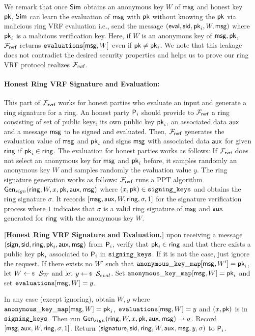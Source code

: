 We remark that once $ \mathsf{Sim} $ obtains an anonymous key $ W $ of  $ \mathsf{msg} $  and honest key $ \mathsf{pk} $,  $ \mathsf{Sim} $ can learn the  evaluation of  $ \mathsf{msg} $ with $ \mathsf{pk} $ without knowing the $ \mathsf{pk} $ via malicious ring VRF evaluation i.e., send the message $ (\mathsf{eval}, \textsf{sid}, \mathsf{pk}_i,W,\mathsf{msg}) $ where $ \mathsf{pk}_i $ is a malicious verification key. Here, if $ W $ is an anonymous key of $ \mathsf{msg}, \mathsf{pk}  $, $ \mathcal{F}_{\textsf{rvrf}} $ returns $ \texttt{evaluations}[\mathsf{msg}, W] $ even if $ \mathsf{pk} \neq \mathsf{pk}_i $. We note that this leakage does not contradict the desired security properties and helps us to prove our ring VRF protocol realizes $ \mathcal{F}_{\textsf{rvrf}} $.  


\paragraph{Honest Ring VRF Signature and Evaluation:} This part of $ \mathcal{F}_{\textsf{rvrf}} $ works for honest parties who evaluate an input and generate a ring signature for a ring. An honest party $ \mathsf{P}_i $ should provide to $ \mathcal{F}_{\textsf{rvrf}} $ a ring consisting of set of public keys, its own public key $ \mathsf{pk}_i $,  an associated data $ \mathsf{aux} $ and a message $ \mathsf{msg} $ to be signed and evaluated. Then, $ \mathcal{F}_{\textsf{rvrf}} $ generates the evaluation value of $ \mathsf{msg} $ and $ \mathsf{pk}_i $ and signs $ \mathsf{msg} $ with associated data $ \mathsf{aux} $ for given $ \mathsf{ring} $ if $ \mathsf{pk}_i \in \mathsf{ring} $. The evaluation for honest parties works as follows: If $ \mathcal{F}_{\textsf{rvrf}} $ does not select an anonymous key for $ \mathsf{msg} $ and $ \mathsf{pk}_i $ before, it samples randomly an anonymous key $ W $ and samples randomly the evaluation value $ y $. The ring signature generation works as follows:  $ \mathcal{F}_{\textsf{rvrf}} $ runs a PPT algorithm $ \mathsf{Gen}_{sign}(\mathsf{ring}, W, x,\mathsf{pk},\mathsf{aux},\mathsf{msg}) $ where $ (x,\mathsf{pk}) \in \texttt{signing\_keys} $ and obtains the ring signature $ \sigma $. It records $  [\mathsf{msg},\mathsf{aux}, W, \mathsf{ring},\sigma, 1]  $ for the signature verification process where $ 1 $ indicates that $ \sigma  $ is a valid ring signature of $ \mathsf{msg} $ and $ \mathsf{aux} $ generated for $ \mathsf{ring} $ with the anonymous key $ W $.

\begin{tcolorbox}[left=2pt,right=2pt]
	\eprint{}{\scriptsize}
	\textbf{[Honest Ring VRF Signature and Evaluation.]} upon receiving a message $(\mathsf{sign}, \textsf{sid}, \mathsf{ring}, \mathsf{pk}_i,\mathsf{aux}, \mathsf{msg})$ from $\mathsf{P}_i$, verify that $\mathsf{pk}_i \in \mathsf{ring}$ and that there exists a public key $\mathsf{pk}_i$ associated to $\mathsf{P}_i$ in $ \texttt{signing\_keys} $. If it is not the case, just ignore the request. 	
	If there exists no $ W' $ such that $ \mathtt{anonymous\_key\_map}[\mathsf{msg},W'] =  \mathsf{pk}_i $, let $ W \leftsample \setsym{S}_W $ and let $y \leftsample \setsym{S}_{eval}$. Set $ \mathtt{anonymous\_key\_map}[\mathsf{msg},W] = \mathsf{pk}_i $ and set $ \texttt{evaluations}[\mathsf{msg}, W] = y$.
	
	In any case (except ignoring), obtain $ W, y $ where $ \mathtt{anonymous\_key\_map}[\mathsf{msg},W] =\mathsf{pk}_i $, $ \texttt{evaluations}[\mathsf{msg}, W] = y$ and  $ (x, \mathsf{pk}) $ is in $\texttt{signing\_keys} $. Then run  $ \mathsf{Gen}_{sign}(\mathsf{ring}, W,x,\mathsf{pk},\mathsf{aux},\mathsf{msg}) \rightarrow \sigma $.
	Record $ [\mathsf{msg},\mathsf{aux}, W, \mathsf{ring},\sigma, 1] $. Return $(\mathsf{signature}, \textsf{sid}, \mathsf{ring},W,\mathsf{aux},\mathsf{msg}, y, \sigma)$ to $\mathsf{P}_i$.
\end{tcolorbox}


